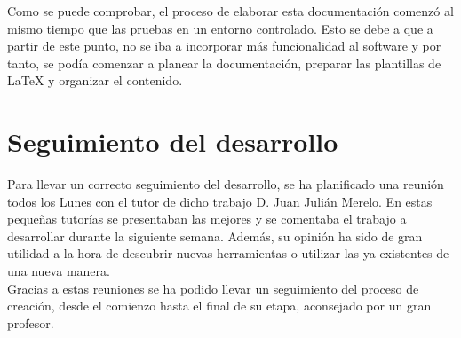 Como se puede comprobar, el proceso de elaborar esta documentación comenzó al mismo tiempo que las pruebas en un entorno controlado. Esto se debe a que a partir de este punto, 
no se iba a incorporar más funcionalidad al software y por tanto, se podía comenzar a planear la documentación, preparar las plantillas de LaTeX y organizar el contenido.

\section{Seguimiento del desarrollo}
Para llevar un correcto seguimiento del desarrollo, se ha planificado una reunión todos los Lunes con el tutor de dicho trabajo D. Juan Julián Merelo. En estas pequeñas 
tutorías se presentaban las mejores y se comentaba el trabajo a desarrollar durante la siguiente semana. Además, su opinión ha sido de gran utilidad a la hora de descubrir
nuevas herramientas o utilizar las ya existentes de una nueva manera.\\

Gracias a estas reuniones se ha podido llevar un seguimiento del proceso de creación, desde el comienzo hasta el final de su etapa, aconsejado por un gran profesor.
